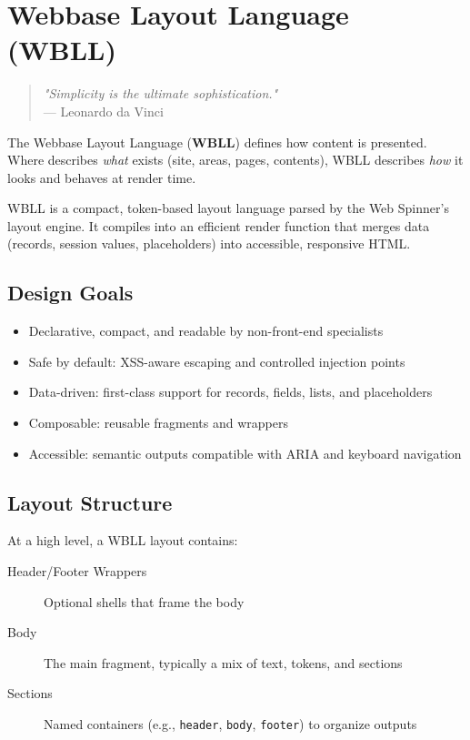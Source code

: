 
\chapter{Webbase Layout Language (WBLL)}
\label{chap:wbll}

\begin{quote}
\textit{"Simplicity is the ultimate sophistication."} \\
— Leonardo da Vinci
\end{quote}

The Webbase Layout Language (\textbf{WBLL}) defines how content is presented. Where \wbdl{} describes \textit{what} exists (site, areas, pages, contents), WBLL describes \textit{how} it looks and behaves at render time.

WBLL is a compact, token-based layout language parsed by the Web Spinner’s layout engine. It compiles into an efficient render function that merges data (records, session values, placeholders) into accessible, responsive HTML.

\section{Design Goals}
\label{sec:wbll-goals}

\begin{itemize}
  \item Declarative, compact, and readable by non-front-end specialists
  \item Safe by default: XSS-aware escaping and controlled injection points
  \item Data-driven: first-class support for records, fields, lists, and placeholders
  \item Composable: reusable fragments and wrappers
  \item Accessible: semantic outputs compatible with ARIA and keyboard navigation
\end{itemize}

\section{Layout Structure}
\label{sec:wbll-structure}

At a high level, a WBLL layout contains:

\begin{description}
  \item[Header/Footer Wrappers] Optional shells that frame the body
  \item[Body] The main fragment, typically a mix of text, tokens, and sections
  \item[Sections] Named containers (e.g., \texttt{header}, \texttt{body}, \texttt{footer}) to organize outputs
\end{description}


